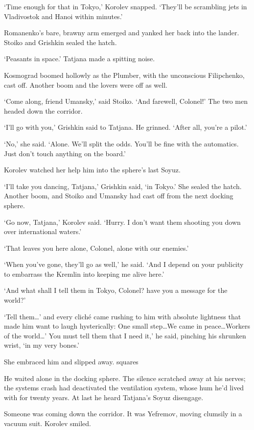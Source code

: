 ‘Time enough for that in Tokyo,’ Korolev snapped. ‘They’ll be scrambling jets in Vladivostok and Hanoi within minutes.’

Romanenko’s bare, brawny arm emerged and yanked her back into the lander. Stoiko and Grishkin sealed the hatch.

‘Peasants in space.’ Tatjana made a spitting noise.

Kosmograd boomed hollowly as the Plumber, with the unconscious Filipchenko, cast off. Another boom and the lovers were off as well.

‘Come along, friend Umansky,’ said Stoiko. ‘And farewell, Colonel!’ The two men headed down the corridor.

‘I’ll go with you,’ Grishkin said to Tatjana. He grinned. ‘After all, you’re a pilot.’

‘No,’ she said. ‘Alone. We’ll split the odds. You’ll be fine with the automatics. Just don’t touch anything on the board.’

Korolev watched her help him into the sphere’s last Soyuz.

‘I’ll take you dancing, Tatjana,’ Grishkin said, ‘in Tokyo.’ She sealed the hatch. Another boom, and Stoiko and Umansky had cast off from the next docking sphere.

‘Go now, Tatjana,’ Korolev said. ‘Hurry. I don’t want them shooting you down over international waters.’

‘That leaves you here alone, Colonel, alone with our enemies.’

‘When you’ve gone, they’ll go as well,’ he said. ‘And I depend on your publicity to embarrass the Kremlin into keeping me alive here.’

‘And what shall I tell them in Tokyo, Colonel? have you a message for the world?’

‘Tell them…’ and every cliché came rushing to him with absolute lightness that made him want to laugh hysterically: One small step…We came in peace…Workers of the world…’ You must tell them that I need it,’ he said, pinching his shrunken wrist, ‘in my very bones.’

She embraced him and slipped away.
squares

He waited alone in the docking sphere. The silence scratched away at his nerves; the systems crash had deactivated the ventilation system, whose hum he’d lived with for twenty years. At last he heard Tatjana’s Soyuz disengage.

Someone was coming down the corridor. It was Yefremov, moving clumsily in a vacuum suit. Korolev smiled.

